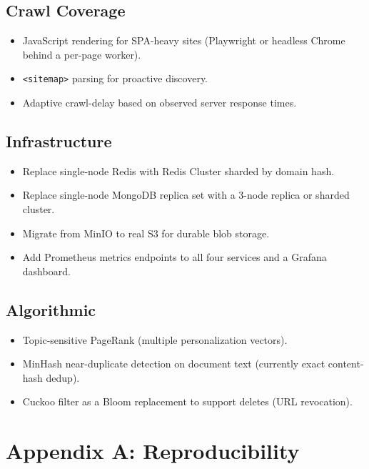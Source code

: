 \documentclass[11pt,a4paper]{article}
\newcommand{\code}[1]{\texttt{#1}}
\begin{document}
\subsection{Crawl Coverage}

\begin{itemize}[leftmargin=1.4em]
  \item JavaScript rendering for SPA-heavy sites (Playwright or headless Chrome behind a per-page worker).
  \item \code{<sitemap>} parsing for proactive discovery.
  \item Adaptive crawl-delay based on observed server response times.
\end{itemize}

\subsection{Infrastructure}

\begin{itemize}[leftmargin=1.4em]
  \item Replace single-node Redis with Redis Cluster sharded by domain hash.
  \item Replace single-node MongoDB replica set with a 3-node replica or sharded cluster.
  \item Migrate from MinIO to real S3 for durable blob storage.
  \item Add Prometheus metrics endpoints to all four services and a Grafana dashboard.
\end{itemize}

\subsection{Algorithmic}

\begin{itemize}[leftmargin=1.4em]
  \item Topic-sensitive PageRank (multiple personalization vectors).
  \item MinHash near-duplicate detection on document text (currently exact content-hash dedup).
  \item Cuckoo filter as a Bloom replacement to support deletes (URL revocation).
\end{itemize}

\appendix

\section{Appendix A: Reproducibility}
\end{document}
